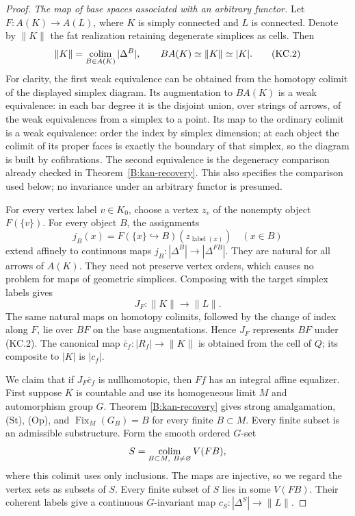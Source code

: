 \begin{proof}
\emph{The map of base spaces associated with an arbitrary functor.}
Let $F:A(K)\to A(L)$, where $K$ is simply connected and $L$ is
connected. Denote by $\|K\|$ the fat realization retaining degenerate
simplices as cells. Then
\[
 \|K\|=\operatorname*{colim}_{B\in A(K)}|\Delta^B|,
 \qquad BA(K)\simeq\|K\|\simeq |K|.
 \tag{KC.2}
\]
For clarity, the first weak equivalence can be obtained from the
homotopy colimit of the displayed simplex diagram. Its augmentation
to $BA(K)$ is a weak equivalence: in each bar degree it is the
disjoint union, over strings of arrows, of the weak equivalences
from a simplex to a point. Its map to the
ordinary colimit is a weak equivalence: order the index by simplex
dimension; at each object the colimit of its proper faces is exactly
the boundary of that simplex, so the diagram is built by cofibrations.
The second equivalence is the degeneracy comparison already checked
in Theorem~\ref{B:kan-recovery}. This also specifies the comparison
used below; no invariance under an arbitrary functor is presumed.

For every vertex label $v\in K_0$, choose a vertex $z_v$ of the
nonempty object $F(\{v\})$. For every object $B$, the assignments
\[
 j_B(x)=F(\{x\}\hookrightarrow B)(z_{\operatorname{label}(x)})
 \quad(x\in B)
\]
extend affinely to continuous maps
$j_B:|\Delta^B|\to|\Delta^{F B}|$. They are natural for all arrows
of $A(K)$. They need not preserve vertex orders, which causes no
problem for maps of geometric simplices. Composing with the target
simplex labels gives
\[
 J_F:\|K\|\longrightarrow\|L\|.
 \tag{KC.3}
\]
The same natural maps on homotopy colimits, followed by the change of
index along $F$, lie over $BF$ on the base augmentations. Hence
$J_F$ represents $BF$ under (KC.2). The canonical map
$\bar c_f:|R_f|\to\|K\|$ is obtained from the cell of $Q$;
its composite to $|K|$ is $|c_f|$.

We claim that if $J_F\bar c_f$ is nullhomotopic, then $Ff$ has an
integral affine equalizer. First suppose $K$ is countable and use
its homogeneous limit $M$ and automorphism group $G$. Theorem
\ref{B:kan-recovery} gives strong amalgamation, (St), (Op), and
$\operatorname{Fix}_M(G_B)=B$ for every finite $B\subset M$.
Every finite subset is an admissible substructure. Form the smooth
ordered $G$-set
\[
 S=\operatorname*{colim}_{B\subset M,\ B\ne\varnothing}
       V(FB),
\]
where this colimit uses only inclusions. The maps are injective, so
we regard the vertex sets as subsets of $S$. Every finite subset of
$S$ lies in some $V(FB)$. Their coherent labels give a continuous
$G$-invariant map $c_S:|\Delta^S|\to\|L\|$.


\end{proof}
